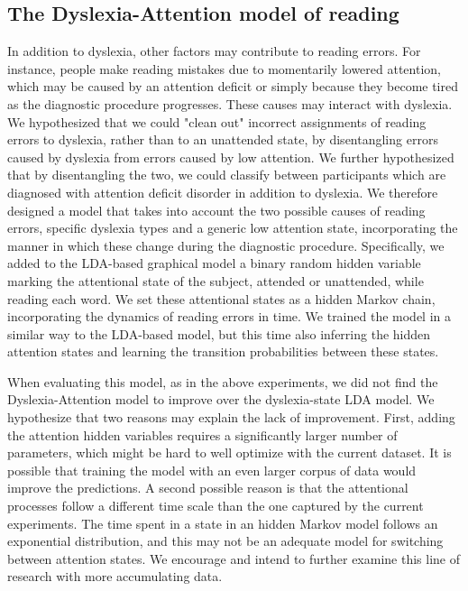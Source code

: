 {{\subsection{The Dyslexia-Attention model of reading}
In addition to dyslexia, other factors may contribute to reading errors. For instance, people make reading mistakes due to momentarily lowered attention, which may be caused by an attention deficit or simply because they become tired as the diagnostic procedure progresses. These causes may interact with dyslexia. We hypothesized that we could "clean out" incorrect assignments of reading errors to dyslexia, rath\-er than to an unattended state, by disentangling errors caus\-ed by dyslexia from errors caused by low attention. We further hypothesized that by disentangling the two, we could classify between participants which are diagnosed with attention deficit disorder in addition to dyslexia. We therefore designed a model that takes into account the two possible causes of reading errors, specific dyslexia types and a generic low attention state, incorporating the manner in which these change during the diagnostic procedure. Specifically, we added to the LDA-based graphical model a binary random hidden variable marking the attentional state of the subject, attended or unattended, while reading each word. We set these attentional states as a hidden Markov chain, incorporating the dynamics of reading errors in time. We trained the model in a similar way to the LDA-based model, but this time also inferring the hidden attention states and learning the transition probabilities between these states.

When evaluating this model, as in the above experiments, we did not find the Dyslexia-Attention model to improve over the dyslexia-state LDA model. We hypothesize that two reasons may explain the lack of improvement. First, adding the attention hidden variables requires a significantly larger number of parameters, which might be hard to well optimize with the current dataset. It is possible that training the model with an even larger corpus of data would improve the predictions. A second possible reason is that the attentional processes follow a different time scale than the one captured by the current experiments. The time spent in a state in an hidden Markov model follows an exponential distribution, and this may not be an adequate model for switching between attention states. We encourage and intend to further examine this line of research with more accumulating data. 


}}
